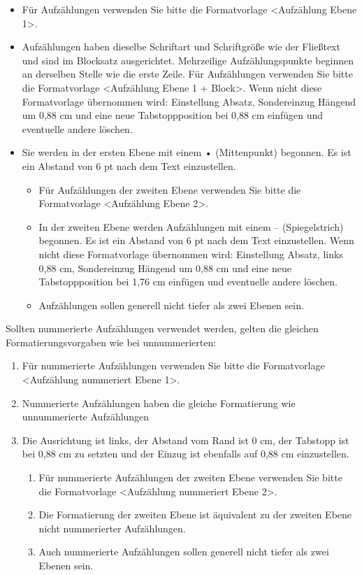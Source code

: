 \documentclass[utf8,biblatex]{lni}
\begin{document}
\begin{itemize}
\item	Für Aufzählungen verwenden Sie bitte die Formatvorlage <Aufzählung Ebene 1>.
\item	Aufzählungen haben dieselbe Schriftart und Schriftgröße wie der Fließtext und sind im Blocksatz ausgerichtet. Mehrzeilige Aufzählungspunkte beginnen an derselben Stelle wie die erste Zeile. Für Aufzählungen verwenden Sie bitte die Formatvorlage <Aufzählung Ebene 1 + Block>. Wenn nicht diese Formatvorlage übernommen wird: Einstellung Absatz, Sondereinzug Hängend um 0,88 cm und eine neue Tabstoppposition bei 0,88 cm einfügen und eventuelle andere löschen.
\item	Sie werden in der ersten Ebene mit einem • (Mittenpunkt) begonnen. Es ist ein Abstand von 6 pt nach dem Text einzustellen. 
\begin{itemize}
\item	Für Aufzählungen der zweiten Ebene verwenden Sie bitte die Formatvorlage <Aufzählung Ebene 2>.
\item	In der zweiten Ebene werden Aufzählungen mit einem – (Spiegelstrich) begonnen. Es ist ein Abstand von 6 pt nach dem Text einzustellen. Wenn nicht diese Formatvorlage übernommen wird: Einstellung Absatz, links 0,88 cm, Sondereinzug Hängend um 0,88 cm und eine neue Tabstoppposition bei 1,76 cm einfügen und eventuelle andere löschen.
\item	Aufzählungen sollen generell nicht tiefer als zwei Ebenen sein.
\end{itemize}
\end{itemize}
Sollten nummerierte Aufzählungen verwendet werden, gelten die gleichen Formatierungsvorgaben wie bei unnummerierten: 
\begin{enumerate}
\item	Für nummerierte Aufzählungen verwenden Sie bitte die Formatvorlage <Aufzählung nummeriert Ebene 1>.
\item		Nummerierte Aufzählungen haben die gleiche Formatierung wie unnummerierte Aufzählungen
\item		Die Ausrichtung ist links, der Abstand vom Rand ist 0 cm, der Tabstopp ist bei 0,88 cm zu setzten und der Einzug ist ebenfalls auf 0,88 cm einzustellen. 
\begin{enumerate}
\item		Für nummerierte Aufzählungen der zweiten Ebene verwenden Sie bitte die Formatvorlage <Aufzählung nummeriert Ebene 2>.
\item		Die Formatierung der zweiten Ebene ist äquivalent zu der zweiten Ebene nicht nummerierter Aufzählungen. 
\item		Auch nummerierte Aufzählungen sollen generell nicht tiefer als zwei Ebenen sein.
\end{enumerate}
\end{enumerate}
\end{document}
